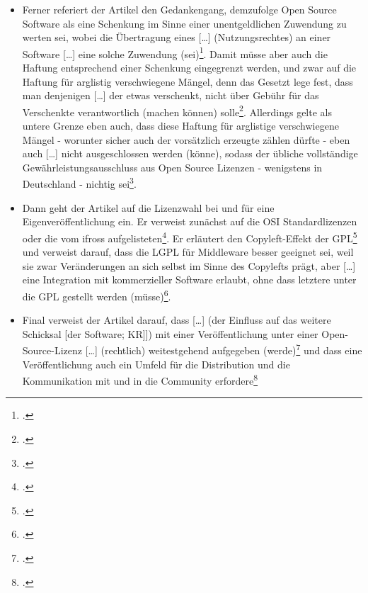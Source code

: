 \documentclass[DIV=calc,BCOR=5mm,11pt,headings=small,oneside,abstract=true, toc=bib]{scrartcl}
\begin{document}
\begin{itemize}
  Autor eine gesonderte umfassende Vereinbarung abschließen müssen, sofern sie
  selbst diese Software als Open Source veröffentlichen
  wollen\footcite[vgl.][175f]{BreGlaGra2008a}
  \item Ferner referiert der Artikel den Gedankengang, demzufolge Open Source
  Software als eine \glqq{}Schenkung\grqq{} im Sinne einer
  \glqq{}unentgeldlichen Zuwendung\grqq{} zu werten sei, wobei die Übertragung
  eines \glqq{}[\ldots] (Nutzungsrechtes) an einer Software [\ldots] eine
  solche Zuwendung (sei)\grqq{}\footcite[vgl.][177]{BreGlaGra2008a}. Damit müsse
  aber auch die Haftung entsprechend einer Schenkung eingegrenzt werden, und
  zwar auf die \glqq{}Haftung für arglistig verschwiegene Mängel\grqq{}, denn
  das Gesetzt lege fest, dass man denjenigen \glqq{}[\ldots] der
  etwas verschenkt, nicht über Gebühr für das Verschenkte verantwortlich
  (machen können) solle\grqq{}\footcite[vgl.][177]{BreGlaGra2008a}. Allerdings
  gelte als untere Grenze eben auch, dass diese \glqq{}Haftung für
  arglistige verschwiegene Mängel\grqq{} - worunter sicher auch der vorsätzlich
  erzeugte zählen dürfte - eben auch \glqq{}[\ldots] nicht ausgeschlossen
  werden (könne)\grqq{}, sodass
  der übliche \glqq{}vollständige Gewährleistungsausschluss\grqq{} aus Open
  Source Lizenzen - wenigstens in Deutschland - \glqq{}nichtig\grqq{}
  sei\footcite[vgl.][177]{BreGlaGra2008a}.
  \item Dann geht der Artikel auf die Lizenzwahl bei und für eine
  Eigenveröffentlichung ein. Er verweist zunächst auf die OSI Standardlizenzen
  oder die vom ifross aufgelisteten\footcite[vgl.][179]{BreGlaGra2008a}. Er
  erläutert den \glqq{}Copyleft-Effekt\grqq{} der
  GPL\footcite[vgl.][180]{BreGlaGra2008a} und verweist darauf, dass die LGPL für
  \glqq{}Middleware\grqq{} besser geeignet sei, weil sie zwar Veränderungen an
  sich selbst im Sinne des Copylefts prägt, aber \glqq{}[\ldots] eine
  Integration mit kommerzieller Software erlaubt, ohne dass letztere
  unter die GPL gestellt werden
  (müsse)\grqq{}\footcite[vgl.][181]{BreGlaGra2008a}. 
  \item Final verweist der Artikel darauf, dass \glqq{}[\ldots] (der Einfluss
  auf das weitere Schicksal [der Software; KR]]) mit einer Veröffentlichung
  unter einer Open-Source-Lizenz [\ldots] (rechtlich) weitestgehend
  aufgegeben (werde)\grqq{}\grqq{}\footcite[vgl.][183]{BreGlaGra2008a} und dass
  eine Veröffentlichung auch ein Umfeld für die Distribution und die
  Kommunikation mit und in die Community
  erfordere\footcite[vgl.][185f]{BreGlaGra2008a}

\end{itemize}
\end{document}

